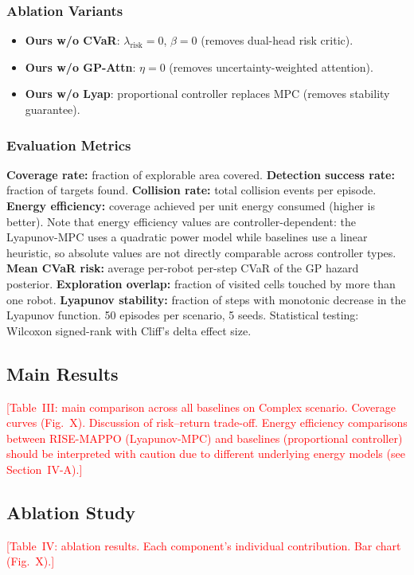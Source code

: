 \documentclass[letterpaper]{IEEEtran}
\newcommand{\lrisk}{\lambda_{\text{risk}}}
\begin{document}
\subsubsection{Ablation Variants}
\begin{itemize}
    \item \textbf{Ours w/o CVaR}: $\lrisk = 0$, $\beta = 0$ (removes dual-head risk critic).
    \item \textbf{Ours w/o GP-Attn}: $\eta = 0$ (removes uncertainty-weighted attention).
    \item \textbf{Ours w/o Lyap}: proportional controller replaces MPC (removes stability guarantee).
\end{itemize}

\subsubsection{Evaluation Metrics}
\textbf{Coverage rate:} fraction of explorable area covered. \textbf{Detection success rate:} fraction of targets found. \textbf{Collision rate:} total collision events per episode. \textbf{Energy efficiency:} coverage achieved per unit energy consumed (higher is better). Note that energy efficiency values are controller-dependent: the Lyapunov-MPC uses a quadratic power model while baselines use a linear heuristic, so absolute values are not directly comparable across controller types. \textbf{Mean CVaR risk:} average per-robot per-step CVaR of the GP hazard posterior. \textbf{Exploration overlap:} fraction of visited cells touched by more than one robot. \textbf{Lyapunov stability:} fraction of steps with monotonic decrease in the Lyapunov function. 50 episodes per scenario, 5 seeds. Statistical testing: Wilcoxon signed-rank with Cliff's delta effect size.

\subsection{Main Results}
\textcolor{red}{[Table~III: main comparison across all baselines on Complex scenario. Coverage curves (Fig.~X). Discussion of risk--return trade-off. Energy efficiency comparisons between RISE-MAPPO (Lyapunov-MPC) and baselines (proportional controller) should be interpreted with caution due to different underlying energy models (see Section~IV-A).]}

\subsection{Ablation Study}
\textcolor{red}{[Table~IV: ablation results. Each component's individual contribution. Bar chart (Fig.~X).]}
\end{document}
